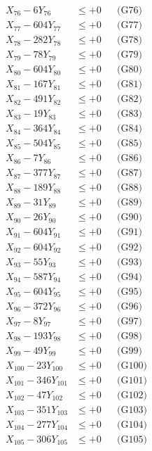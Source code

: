 \documentclass[a4paper,10pt]{article}
\begin{document}
{\begin{align}
X_{76} - 6Y_{76} &\leq +0 && \text{(G76)} \\
X_{77} - 604Y_{77} &\leq +0 && \text{(G77)} \\
X_{78} - 282Y_{78} &\leq +0 && \text{(G78)} \\
X_{79} - 78Y_{79} &\leq +0 && \text{(G79)} \\
X_{80} - 604Y_{80} &\leq +0 && \text{(G80)} \\
\allowbreak
X_{81} - 167Y_{81} &\leq +0 && \text{(G81)} \\
X_{82} - 491Y_{82} &\leq +0 && \text{(G82)} \\
X_{83} - 19Y_{83} &\leq +0 && \text{(G83)} \\
X_{84} - 364Y_{84} &\leq +0 && \text{(G84)} \\
X_{85} - 504Y_{85} &\leq +0 && \text{(G85)} \\
X_{86} - 7Y_{86} &\leq +0 && \text{(G86)} \\
X_{87} - 377Y_{87} &\leq +0 && \text{(G87)} \\
X_{88} - 189Y_{88} &\leq +0 && \text{(G88)} \\
X_{89} - 31Y_{89} &\leq +0 && \text{(G89)} \\
X_{90} - 26Y_{90} &\leq +0 && \text{(G90)} \\
\allowbreak
X_{91} - 604Y_{91} &\leq +0 && \text{(G91)} \\
X_{92} - 604Y_{92} &\leq +0 && \text{(G92)} \\
X_{93} - 55Y_{93} &\leq +0 && \text{(G93)} \\
X_{94} - 587Y_{94} &\leq +0 && \text{(G94)} \\
X_{95} - 604Y_{95} &\leq +0 && \text{(G95)} \\
X_{96} - 372Y_{96} &\leq +0 && \text{(G96)} \\
X_{97} - 8Y_{97} &\leq +0 && \text{(G97)} \\
X_{98} - 193Y_{98} &\leq +0 && \text{(G98)} \\
X_{99} - 49Y_{99} &\leq +0 && \text{(G99)} \\
X_{100} - 23Y_{100} &\leq +0 && \text{(G100)} \\
\allowbreak
X_{101} - 346Y_{101} &\leq +0 && \text{(G101)} \\
X_{102} - 47Y_{102} &\leq +0 && \text{(G102)} \\
X_{103} - 351Y_{103} &\leq +0 && \text{(G103)} \\
X_{104} - 277Y_{104} &\leq +0 && \text{(G104)} \\
X_{105} - 306Y_{105} &\leq +0 && \text{(G105)} \\

\end{align}}
\end{document}
